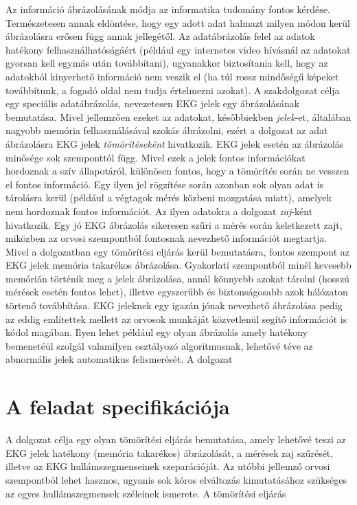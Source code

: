 \documentclass[oneside,titlepage,12pt,a4paper]{report}
\begin{document}
Az információ ábrázolásának módja az informatika tudomány fontos kérdése. Természetesen annak eldöntése, hogy egy adott adat halmazt milyen módon kerül ábrázolásra erősen függ annak jellegétől. Az adatábrázolás felel az adatok hatékony felhasználhatóságáért (például egy internetes video hívásnál az adatokat gyorsan kell egymás után továbbítani), ugyanakkor biztosítania kell, hogy az adatokból kinyerhető információ nem veszik el (ha túl rossz mindőségű képeket továbbítunk, a fogadó oldal nem tudja értelmezni azokat). 
	A szakdolgozat célja egy speciális adatábrázolás, nevezetesen EKG jelek egy ábrázolásának bemutatása. Mivel jellemzően ezeket az adatokat, későbbiekben \textit{jelek}-et, általában nagyobb memória felhasználásával szokás ábrázolni, ezért a dolgozat az adat ábrázolásra EKG jelek \textit{tömörítéseként} hivatkozik. EKG jelek esetén az ábrázolás minősége sok szemponttól függ. Mivel ezek a jelek fontos információkat hordoznak a szív állapotáról, különösen fontos, hogy a tömörítés során ne vesszen el fontos információ. Egy ilyen jel rögzítése során azonban sok olyan adat is tárolásra kerül (például a végtagok mérés közbeni mozgatása miatt), amelyek nem hordoznak fontos információt. Az ilyen adatokra a dolgozat \textit{zaj}-ként hivatkozik. Egy jó EKG ábrázolás sikeresen szűri a mérés során keletkezett zajt, miközben az orvosi szempontból fontosnak nevezhető információt megtartja. Mivel a dolgozatban egy tömörítési eljárás kerül bemutatásra, fontos szempont az EKG jelek memória takarékos ábrázolása. Gyakorlati szempontból minél kevesebb memórián történik meg a jelek ábrázolása, annál könnyebb azokat tárolni (hosszú mérések esetén fontos lehet), illetve egyszerűbb és biztonságosabb azok hálózaton törtenő továbbítása. EKG jeleknek egy igazán jónak nevezhető ábrázolása pedig az eddig említettek mellett az orvosok munkáját közvetlenül segítő információt is kódol magában. Ilyen lehet például egy olyan ábrázolás amely hatékony bemenetéül szolgál valamilyen osztályozó algoritmusnak, lehetővé téve az abnormális jelek automatikus felismerését.        
	A dolgozat
		
\section{A feladat specifikációja}

A dolgozat célja egy olyan tömörítési eljárás bemutatása, amely lehetővé teszi az EKG jelek hatékony (memória takarékos) ábrázolását, a mérések zaj szűrését, illetve az EKG hullámszegmenseinek szeparációját. Az utóbbi jellemző orvosi szempontból lehet hasznos, ugyanis sok kóros elváltozás kimutatásához szükséges az egyes hullámszegmensek széleinek ismerete. A tömörítési eljárás
\end{document}
